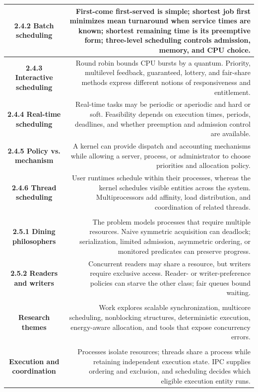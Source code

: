 \documentclass[10pt,letterpaper]{article}
\begin{document}
\begin{longtable}{C N}
\textbf{2.4.2 Batch scheduling} & First-come first-served is simple; shortest job first minimizes mean turnaround when service times are known; shortest remaining time is its preemptive form; three-level scheduling controls admission, memory, and CPU choice.\\\hline
\textbf{2.4.3 Interactive scheduling} & Round robin bounds CPU bursts by a quantum. Priority, multilevel feedback, guaranteed, lottery, and fair-share methods express different notions of responsiveness and entitlement.\\\hline
\textbf{2.4.4 Real-time scheduling} & Real-time tasks may be periodic or aperiodic and hard or soft. Feasibility depends on execution times, periods, deadlines, and whether preemption and admission control are available.\\\hline
\textbf{2.4.5 Policy vs. mechanism} & A kernel can provide dispatch and accounting mechanisms while allowing a server, process, or administrator to choose priorities and allocation policy.\\\hline
\textbf{2.4.6 Thread scheduling} & User runtimes schedule within their processes, whereas the kernel schedules visible entities across the system. Multiprocessors add affinity, load distribution, and coordination of related threads.\\\hline
{}\\*\hline
\textbf{2.5.1 Dining philosophers} & The problem models processes that require multiple resources. Naive symmetric acquisition can deadlock; serialization, limited admission, asymmetric ordering, or monitored predicates can preserve progress.\\\hline
\textbf{2.5.2 Readers and writers} & Concurrent readers may share a resource, but writers require exclusive access. Reader- or writer-preference policies can starve the other class; fair queues bound waiting.\\\hline
{}\\*\hline
\textbf{Research themes} & Work explores scalable synchronization, multicore scheduling, nonblocking structures, deterministic execution, energy-aware allocation, and tools that expose concurrency errors.\\\hline
{}\\*\hline
\textbf{Execution and coordination} & Processes isolate resources; threads share a process while retaining independent execution state. IPC supplies ordering and exclusion, and scheduling decides which eligible execution entity runs.\\\hline
\end{longtable}
\normalsize
\end{document}
